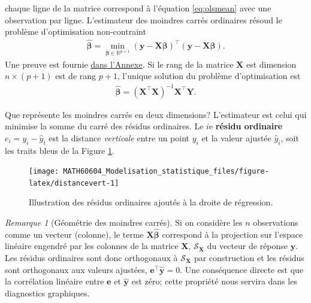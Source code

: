 \documentclass[
  11pt,
  letterpaper,
]{article}
\theoremstyle{definition}
\theoremstyle{definition}
\theoremstyle{definition}
\theoremstyle{definition}
\theoremstyle{remark}
\newtheorem*{remark}{Remarque}
\begin{document}
chaque ligne de la matrice correspond à l'équation \eqref{eq:olsmean} avec une observation par ligne.
L'estimateur des moindres carrés ordinaires résoud le problème d'optimisation non-contraint
\begin{align*}
\widehat{\boldsymbol{\beta}}=\min_{\boldsymbol{\beta} \in \mathbb{R}^{p+1}}(\boldsymbol{y}-\mathbf{X}\boldsymbol{\beta})^\top(\boldsymbol{y}-\mathbf{X}\boldsymbol{\beta}).
\end{align*}
Une preuve est fournie \protect\hyperlink{ols}{dans l'Annexe}. Si le rang de la matrice \(\mathbf{X}\) est dimension \(n \times (p+1)\) est de rang \(p+1\), l'unique solution du problème d'optimisation est
\begin{align}
\widehat{\boldsymbol{\beta}} = (\mathbf{X}^{\top} \mathbf{X})^{-1} \mathbf{X}^{\top} \boldsymbol{Y}. \label{eq:ols}
\end{align}

Que représente les moindres carrés en deux dimensions? L'estimateur est celui qui minimise la somme du carré des résidus ordinaires. Le \(i\)e \textbf{résidu ordinaire} \(e_i = y_i -\widehat{y}_i\) est la distance \emph{verticale} entre un point \(y_i\) et la valeur ajustée \(\widehat{y}_i\), soit les traits bleus de la Figure \ref{fig:distancevert}.

\begin{figure}

{\centering \texttt{[image: MATH60604\_Modelisation\_statistique\_files/figure-latex/distancevert-1]} 

}

\caption{Illustration des résidus ordinaires ajoutés à la droite de régression.}\label{fig:distancevert}
\end{figure}

\begin{remark}[Géométrie des moindres carrés]
Si on considère les \(n\) observations comme un vecteur (colonne), le terme \(\mathbf{X} \widehat{\boldsymbol{\beta}}\) correspond à la projection sur l'espace linéaire engendré par les colonnes de la matrice \(\mathbf{X}\), \(\mathscr{S}_{\mathbf{X}}\) du vecteur de réponse \(\boldsymbol{y}\). Les résidus ordinaires sont donc orthogonaux à \(\mathscr{S}_{\mathbf{X}}\) par construction et les résidus sont orthogonaux aux valeurs ajustées, \(\boldsymbol{e}^\top\widehat{\boldsymbol{y}}=0\).
Une conséquence directe est que la corrélation linéaire entre \(\boldsymbol{e}\) et \(\widehat{\boldsymbol{y}}\) est zéro; cette propriété nous servira dans les diagnostics graphiques.
\end{remark}
\end{document}
